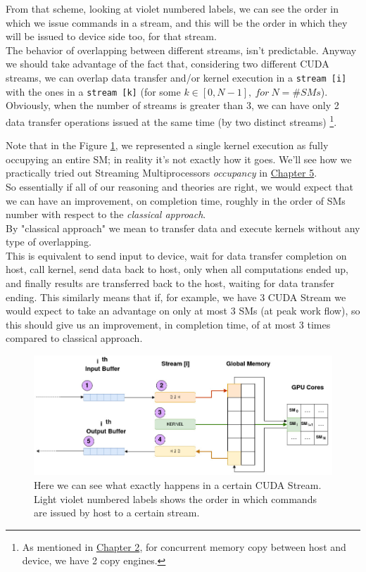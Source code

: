 	From that scheme, looking at violet numbered labels, we can see the order in which we issue commands in a stream, and this will be the order in which they will be issued to device side too, for that stream. \\
	The behavior of overlapping between different streams, isn't predictable. Anyway we should take advantage of the fact that, considering two different CUDA streams, we can overlap data transfer and/or kernel execution in a \texttt{stream [i]} with the ones in a \texttt{stream [k]} (for some \(k\in[0,N-1], \: for \: N =\# SMs\)). Obviously, when the number of streams is greater than 3, we can have only 2 data transfer operations issued at the same time (by two distinct streams) \footnote{As mentioned in \hyperref[chap:tools]{Chapter 2}, for concurrent memory copy between host and device, we have 2 copy engines.}.
	
	Note that in the Figure \ref{fig:singleStream}, we represented a single kernel execution as fully occupying an entire SM; in reality it's not exactly how it goes.
	We'll see how we practically tried out Streaming Multiprocessors \textit{occupancy} in  \hyperref[chap:experim]{Chapter 5}. \\
	
	So essentially if all of our reasoning and theories are right, we would expect that we can have an improvement, on completion time, roughly in the order of SMs number with respect to the \textit{classical approach}.\\
	By "classical approach" we mean to transfer data and execute kernels without any type of overlapping.\\ This is equivalent to send input to device, wait for data transfer completion on host, call kernel, send data back to host, only when all computations ended up, and finally results are transferred back to the host, waiting for data transfer ending.
	This similarly means that if, for example, we have 3 CUDA Stream we would expect to take an advantage on only at most 3 SMs (at peak work flow), so this should give us an improvement, in completion time, of at most 3 times compared to classical approach.\\

	\begin{figure}%
		\includegraphics[scale=0.56]{images/singleStream.jpg}
		\caption{Here we can see what exactly happens in a certain CUDA Stream. Light violet numbered labels shows the order in which commands are issued by host to a certain stream.}
		\label{fig:singleStream}		
		
	\end{figure}	

